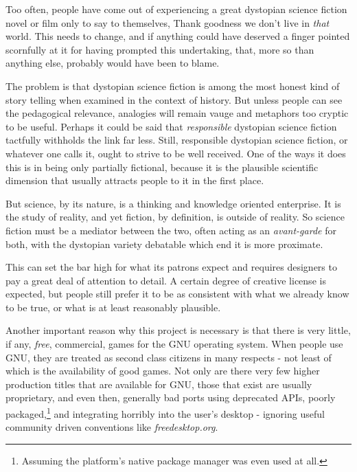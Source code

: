 

\startTimelineCorrespondenceDocument
    \startlines
    
    \stoplines
\stopTimelineCorrespondenceDocument
\page

Too often, people have come out of experiencing a great dystopian science fiction novel or film only to say to themselves, Thank goodness we don't live in {\it that} world. This needs to change, and if anything could have deserved a finger pointed scornfully at it for having prompted this undertaking, that, more so than anything else, probably would have been to blame.

The problem is that dystopian science fiction is among the most honest kind of story telling when examined in the context of history. But unless people can see the pedagogical relevance, analogies will remain vauge and metaphors too cryptic to be useful. Perhaps it could be said that {\it responsible} dystopian science fiction tactfully withholds the link far less.
    {}
Still, responsible dystopian science fiction, or whatever one calls it, ought to strive to be well received. One of the ways it does this is in being only partially fictional, because it is the plausible scientific dimension that usually attracts people to it in the first place.

But science, by its nature, is a thinking and knowledge oriented enterprise. It is the study of reality, and yet fiction, by definition, is outside of reality. So science fiction must be a mediator between the two, often acting as an {\it avant-garde} for both, with the dystopian variety debatable which end it is more proximate.

This can set the bar high for what its patrons expect and requires designers to pay a great deal of attention to detail. A certain degree of creative license is expected, but people still prefer it to be as consistent with what we already know to be true, or what is at least reasonably plausible.

Another important reason why this project is necessary is that there is very little, if any, {\it free}, commercial, games for the GNU operating system. When people use GNU, they are treated as second class citizens in many respects - not least of which is the availability of good games. Not only are there very few higher production titles that are available for GNU, those that exist are usually proprietary, and even then, generally bad ports using deprecated APIs, poorly packaged,\footnote{Assuming the platform's native package manager was even used at all.} and integrating horribly into the user's desktop - ignoring  useful community driven conventions like {\it freedesktop.org}. 


